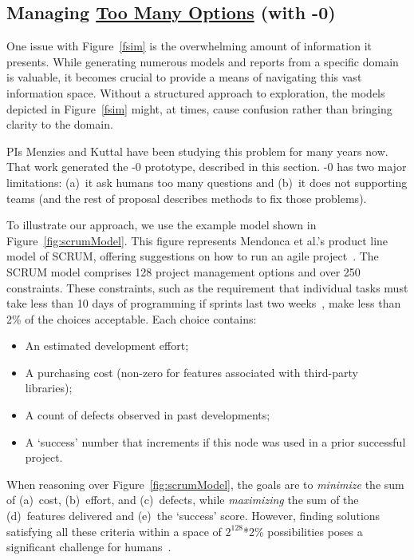 \documentclass[twoside]{NSF}
\newenvironment{myitemize}
{ \begin{itemize}[topsep=0pt,itemsep=0pt,leftmargin=*]
    \setlength{\itemsep}{0pt}
    \setlength{\parskip}{0pt}
    \setlength{\parsep}{0pt}     }
{ \end{itemize}                  }
\newcommand{\bi}{\begin{myitemize}}
\newcommand{\ei}{\end{myitemize}}
\newcommand{\IT}{{\sffamily {\em \mbox{ADVICE}}}}
\newcommand{\ITS}[1]{\mbox{{\IT}-#1}}
\begin{document}
\begin{nsfdescription}
\section{Managing \underline{Too Many Options} (with \ITS{0})}\label{advice0}

One issue with Figure~\ref{fsim} is the overwhelming amount of information it presents. While generating numerous models and reports from a specific domain is valuable, it becomes crucial to provide a means of navigating this vast information space. Without a structured approach to exploration, the models depicted in Figure~\ref{fsim} might, at times, cause confusion rather than bringing clarity to the domain.



PIs Menzies and Kuttal have been studying this
problem for many years now. That work
generated the   \ITS{0} 
prototype, described in this section.
\ITS{0} has two major limitations:
(a)~it ask humans too many questions and 
(b)~it does not supporting teams
(and the rest of proposal  describes methods to   fix those problems).

To illustrate our approach, we use the example model shown in Figure~\ref{fig:scrumModel}. This figure represents Mendonca et al.'s product line model of SCRUM, offering suggestions on how to run an agile project~\cite{mendonca2009splot}. The SCRUM model comprises 128 project management options and over 250 constraints. These constraints, such as the requirement that individual tasks must take less than 10 days of programming if sprints last two weeks~\cite{mendonca2009splot}, make less than 2\% of the choices acceptable. Each choice contains:
\bi
\item An estimated development effort;
\item A purchasing cost (non-zero for features associated with third-party libraries);
\item A count of defects observed in past developments;
\item
A `success' number that increments if this node was used in a prior successful project.
\ei
When reasoning over
Figure~\ref{fig:scrumModel}, the goals are to   {\em minimize} 
the sum of 
(a)~cost, (b)~effort, and (c)~defects, while {\em maximizing}
the sum of 
the (d)~features delivered and (e)~the `success' score.  
However, finding solutions satisfying all these criteria 
 within a space
 of $2^{128}$*2\% possibilities  poses a significant challenge for humans~\cite{lustosa21}.  


\end{nsfdescription}
\end{document}
